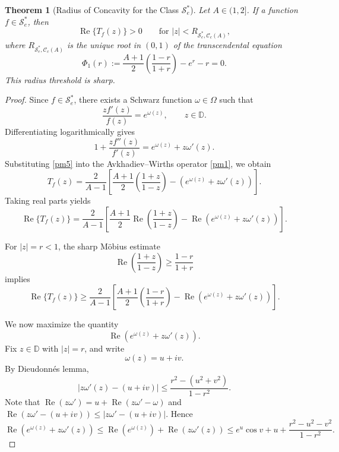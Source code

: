 \documentclass[12pt]{article}
\newtheorem{theorem}{Theorem}[section]
\renewcommand{\Re}{\operatorname{Re}}
\begin{document}
\begin{theorem}[Radius of Concavity for the Class $\mathcal{S}_e^*$]
\label{T1}
Let $A\in(1,2]$. If a function $f\in\mathcal{S}_e^*$, then
\begin{equation}\label{operator_inequality}
\Re\{T_f(z)\}>0 \qquad \text{for } |z|<R_{\mathcal{S}_e^*,\mathcal{C}_c(A)},
\end{equation}
where $R_{\mathcal{S}_e^*,\mathcal{C}_c(A)}$ is the unique root in $(0,1)$ of the transcendental equation
\begin{equation}\label{pm3}
\Phi_1(r) := \frac{A+1}{2} \left( \frac{1-r}{1+r} \right) - e^r - r = 0.
\end{equation}
This radius threshold is sharp.
\end{theorem}
\begin{proof}
Since $f\in\mathcal{S}_e^*$, there exists a Schwarz function $\omega\in\Omega$ such that
\begin{equation}\label{pm4}
\frac{zf'(z)}{f(z)} = e^{\omega(z)}, \qquad z\in\mathbb{D}.
\end{equation}
Differentiating logarithmically gives
\begin{equation}\label{pm5}
1+\frac{zf''(z)}{f'(z)}
=
e^{\omega(z)}+z\omega'(z).
\end{equation}
Substituting \eqref{pm5} into the Avkhadiev--Wirths operator \eqref{pm1}, we obtain
\begin{equation}\label{pm6}
T_f(z)
=
\frac{2}{A-1}
\left[
\frac{A+1}{2}\left(\frac{1+z}{1-z}\right)
-
\left(e^{\omega(z)}+z\omega'(z)\right)
\right].
\end{equation}
Taking real parts yields
\begin{equation}\label{pm7}
\Re\{T_f(z)\}
=
\frac{2}{A-1}
\left[
\frac{A+1}{2}
\Re\left(\frac{1+z}{1-z}\right)
-
\Re\left(e^{\omega(z)}+z\omega'(z)\right)
\right].
\end{equation}

For $|z|=r<1$, the sharp M\"obius estimate
\[
\Re\left(\frac{1+z}{1-z}\right)
\ge
\frac{1-r}{1+r}
\]
implies
\begin{equation}\label{pm8}
\Re\{T_f(z)\}
\ge
\frac{2}{A-1}
\left[
\frac{A+1}{2}\left(\frac{1-r}{1+r}\right)
-
\Re\left(e^{\omega(z)}+z\omega'(z)\right)
\right].
\end{equation}

We now maximize the quantity
\[
\Re\left(e^{\omega(z)}+z\omega'(z)\right).
\]
Fix $z\in\mathbb{D}$ with $|z|=r$, and write
\[
\omega(z)=u+iv.
\]
By Dieudonn\'es lemma,
\begin{equation}\label{pm9}
\left|
z\omega'(z)-(u+iv)
\right|
\le
\frac{r^2-(u^2+v^2)}{1-r^2}.
\end{equation}
Note that $\Re(z\omega')=u+\Re(z\omega'-\omega)$ and $\Re(z\omega'-(u+iv))\leq |z\omega'-(u+iv)|$.
Hence
\begin{equation}\label{pm10}
\Re\left(e^{\omega(z)}+z\omega'(z)\right)
\le \Re\left(e^{\omega(z)}\right)+\Re\left(z\omega'(z)\right)\leq
e^u\cos v
+
u
+
\frac{r^2-u^2-v^2}{1-r^2}.
\end{equation}


\end{proof}
\end{document}
